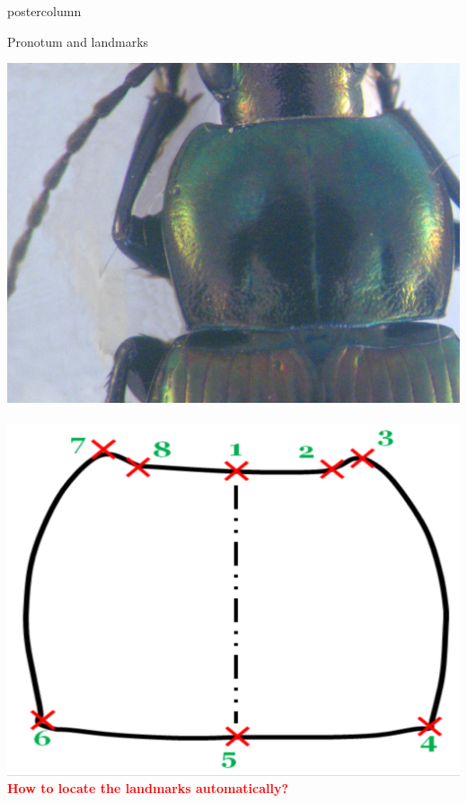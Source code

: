 \newif\ifinria
\def\ptitle{EB-Net for landmarking on pronotum images} %
\def\pauthor{Le Van Linh} %
\def\padvisors{Beurton-Aimar Marie, Zemmari Akka, Parisey Nicolas} %
\def\pteam{I\&S} %
\def\pinstitute{Univ. Bordeaux, LaBRI, France} %
\def\pdate{Thursday April 4, 2019} %
\inriatrue %



\graphicspath{{./fig/}} %
\setlength{\columnheight}{588ex} %
\newcommand{\pname}{\textsc{Priva-Stream}\xspace} %


\begin{frame}
  \begin{columns}
    \begin{column}{.49\textwidth}
      \begin{beamercolorbox}[center,wd=\textwidth]{postercolumn}
        \begin{minipage}[T]{.95\textwidth}
          \parbox[t][\columnheight]{\textwidth}{
            
            \begin{block}{Pronotum and landmarks}
            
            \centering
            
            \includegraphics[width=.45\textwidth]{images/pronotum.JPG}~~
            \includegraphics[width=.45\textwidth]{images/pronotum.png}            \\[0.2cm]
            \textbf{\textcolor{red}{How to locate the landmarks automatically?}}
            \end{block}
            
}
\end{minipage}
\end{beamercolorbox}
\end{column}
\end{columns}
\end{frame}
